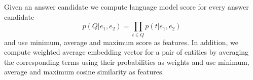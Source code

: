 Given an answer candidate we compute language model score for every answer candidate $$p(Q|e_1, e_2) = \prod_{t\in Q} p(t | e_1, e_2)$$ and use minimum, average and maximum score as features.
In addition, we compute weighted average embedding vector for a pair of entities by averaging the corresponding terms using their probabilities as weights and use minimum, average and maximum cosine similarity as features.

